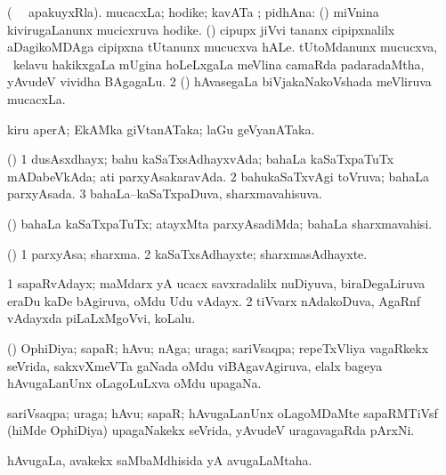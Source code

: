 \bentry
{}
\gl{\nA}
\bmng
\bnum
{} (\bava\  \ucAcx\ apakuyxRla). mucacxLa; hodike; kavATa ; pidhAna: 
\banum
{} (\pArxvi) miVnina kivirugaLanunx mucicxruva hodike. 
 (\pArxvi) cipupx jiVvi tananx cipipxnalilx aDagikoMDAga cipipxna tUtanunx mucucxva hALe. 
 tUtoMdanunx mucucxva, \udA\ kelavu hakikxgaLa mUgina hoLeLxgaLa meVlina camaRda padaradaMtha, yAvudeV vividha BAgagaLu. 
\eanum
\numie
\num{2} (\savi) hAvasegaLa biVjakaNakoVshada meVliruva mucacxLa. 
\enum
\emng
\eentry

\bentry
{}
\gl{\nA}
\bmng
kiru aperA; EkAMka giVtanATaka; laGu geVyanATaka. 
\emng
\eentry

\bentry
{}
\gl{\gu}
\bmng
(\pArxparx) 
\bnum
\num{1} dusAsxdhayx; bahu kaSaTxsAdhayxvAda; bahaLa kaSaTxpaTuTx mADabeVkAda; ati parxyAsakaravAda. 
\num{2} bahukaSaTxvAgi toVruva; bahaLa parxyAsada. 
\num{3} bahaLa--kaSaTxpaDuva, sharxmavahisuva. 
\enum
\emng
\eentry

\bentry
{}
\gl{\kirxvi}
\bmng
(\pArxparx) bahaLa kaSaTxpaTuTx; atayxMta parxyAsadiMda; bahaLa sharxmavahisi. 
\emng
\eentry

\bentry
{}
\gl{\nA}
\bmng
(\pArxparx) 
\bnum
\num{1} parxyAsa; sharxma. 
\num{2} kaSaTxsAdhayxte; sharxmasAdhayxte. 
\enum
\emng
\eentry

\bentry
{}
\gl{\nA}
\bmng
\bnum
\num{1} sapaRvAdayx; maMdarx yA ucacx savxradalilx nuDiyuva, biraDegaLiruva eraDu kaDe bAgiruva, oMdu Udu vAdayx.  
\num{2} tiVvarx nAdakoDuva, AgaRnf vAdayxda piLaLxMgoVvi, koLalu. 
\enum
\emng
\eentry

\bentry
{}
\gl{\nA}
\bmng
(\jiVvi) OphiDiya; sapaR; hAvu; nAga; uraga; sariVsaqpa; repeTxVliya vagaRkekx seVrida, sakxvXmeVTa gaNada oMdu viBAgavAgiruva, elalx bageya hAvugaLanUnx oLagoLuLxva oMdu upagaNa. 
\emng
\eentry

\bentry
{}
\gl{\nA}
\bmng
sariVsaqpa; uraga; hAvu; sapaR; hAvugaLanUnx oLagoMDaMte sapaRMTiVsf (hiMde OphiDiya) upagaNakekx seVrida, yAvudeV uragavagaRda pArxNi. 
\emng
\eentry

\bentry
{}
\gl{\gu}
\bmng
hAvugaLa, avakekx saMbaMdhisida yA avugaLaMtaha. 
\emng
\eentry

